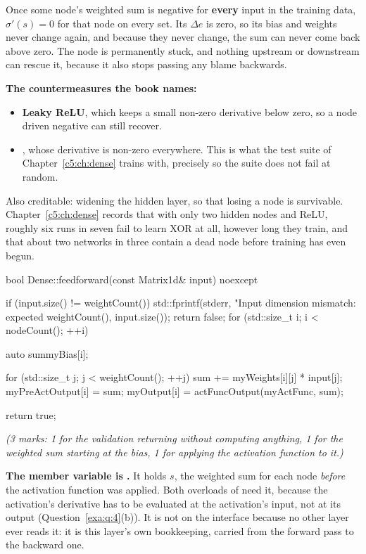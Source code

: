 Once some node's weighted sum is negative for \textbf{every} input in the training data,
$\sigma'(s) = 0$ for that node on every set. Its $\Delta e$ is zero, so its bias and weights
never change again, and because they never change, the sum can never come back above zero. The node
is permanently stuck, and nothing upstream or downstream can rescue it, because it also stops
passing any blame backwards. 

\textbf{The countermeasures the book names:}
\begin{itemize}
  \item \textbf{Leaky ReLU}, which keeps a small non-zero derivative below zero, so a node driven
    negative can still recover.
  \item \textbf{}, whose derivative is non-zero everywhere. This is what the test suite of
    Chapter~\ref{c5:ch:dense} trains with, precisely so the suite does not fail at random.
\end{itemize}
Also creditable: widening the hidden layer, so that losing a node is survivable.
Chapter~\ref{c5:ch:dense} records that with only two hidden nodes and ReLU, roughly six runs in
seven fail to learn XOR at all, however long they train, and that about two networks in three
contain a dead node before training has even begun. 


\begin{cppcode}
bool Dense::feedforward(const Matrix1d& input) noexcept
{
    if (input.size() != weightCount())
    {
        std::fprintf(stderr, "Input dimension mismatch: expected %
            weightCount(), input.size());
        return false;
    }
    for (std::size_t i{}; i < nodeCount(); ++i)
    {
        auto sum{myBias[i]};

        for (std::size_t j{}; j < weightCount(); ++j)
        {
            sum += myWeights[i][j] * input[j];
        }
        myPreActOutput[i] = sum;
        myOutput[i]       = actFuncOutput(myActFunc, sum);
    }
    return true;
}
\end{cppcode}

\noindent\textit{(3 marks: 1 for the validation returning  without computing anything,
1 for the weighted sum starting at the bias, 1 for applying the activation function to it.)}

\textbf{The member variable is .} It holds $s$, the weighted sum for each
node \emph{before} the activation function was applied. Both overloads of  need
it, because the activation's derivative has to be evaluated at the activation's input, not at its
output (Question~\ref{exa:q:4}(b)). It is not on the interface because no other layer ever reads it:
it is this layer's own bookkeeping, carried from the forward pass to the backward one. 

